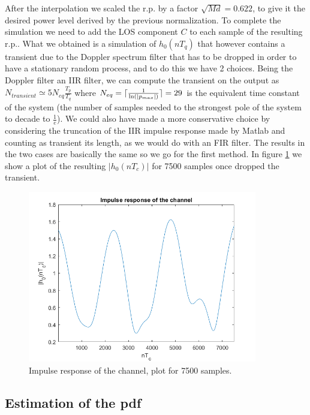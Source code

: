 \documentclass[a4paper,11.5pt]{article}
\DeclarePairedDelimiter{\ceil}{\lceil}{\rceil}
\begin{document}
\noindent After the interpolation we scaled the r.p. by a factor $\sqrt{Md}=0.622$, to give it the desired power level derived by the previous normalization. To complete the simulation we need to add the LOS component $C$ to each sample of the resulting r.p.. What we obtained is a simulation of $h_0(nT_q)$ that however contains a transient due to the Doppler spectrum filter that has to be dropped in order to have a stationary random process, and to do this we have 2 choices. Being the Doppler filter an IIR filter, we can compute the transient on the output as $N_{transient}\simeq 5N_{eq}\frac{T_p}{T_q}$ where $N_{eq}=\ceil{{\frac{1}{\ln(|p_{max}|)}}}=29$ is the equivalent time constant of the system (the number of samples needed to the strongest pole of the system to decade to $\frac{1}{e}$). We could also have made a more conservative choice by considering the truncation of the IIR impulse response made by Matlab and counting as transient its length, as we would do with an FIR filter. The results in the two cases are basically the same so we go for the first method. In figure \ref{fig:imp-resp} we show a plot of the resulting $|h_0(nT_c)|$ for 7500 samples once dropped the transient.

\begin{figure}[ht]
	\begin{center}    
		\includegraphics[width=10cm]{figs/imp-resp.png}
		\caption{Impulse response of the channel, plot for 7500 samples.}
		\label{fig:imp-resp}
	\end{center}
\end{figure}

\subsection*{Estimation of the pdf}
\end{document}
